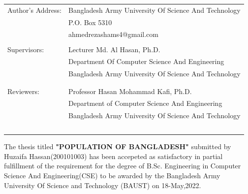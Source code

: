 \documentclass[a4paper,12pt]{article}
\begin{document}
\begin{center}
\begin{tabular}{ll}
Author's Address:
& Bangladesh Army University Of Science And Technology \\
& P.O. Box 5310 \\
& ahmedrezashams4@gmail.com \\
\\
Supervisors:
& Lecturer Md. Al Hasan, Ph.D.\\
& Department Of Computer Science And Engineering\\%
& Bangladesh Army University Of Science And Technology\\
\\
\\
Reviewers:
& Professor Hasan Mohammad Kafi, Ph.D.\\
& Department of Computer Science And Engineering\\
& Bangladesh Army University Of Science And Technology \\
\
\\
\end{tabular}

\vfill


\end{center}
\newpage

\large
\justifying
The thesis titled \textbf{"POPULATION OF BANGLADESH"} submitted by Huzaifa Hassan(200101003) has  been accepeted as satisfactory in partial fulfillment of the requirement for the degree of B.Sc. Engineering in Computer Science And Engineering(CSE) to be awarded by the Bangladesh Army University Of Science and Technology (BAUST) on 18-May,2022.
\end{document}
